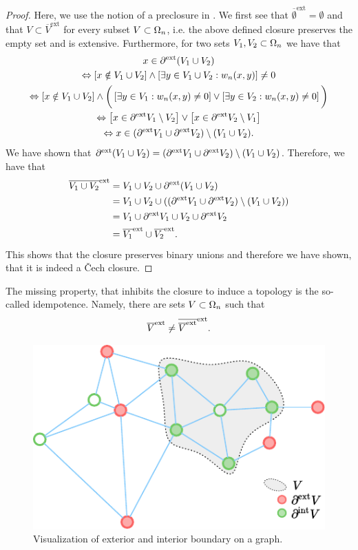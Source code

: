\begin{proof}
Here, we use the notion of a preclosure in \cite{vcech1966topological}.
We first see that $\overline{\emptyset}^{\text{ext}}=\emptyset$ and that $V\subset \overline{V}^{\text{ext}}$ for every subset $V\subset\Omega_n$, i.e. the above defined closure preserves the empty set and is extensive. Furthermore, for two sets $V_1,V_2\subset \Omega_n$ we have that
%
\begin{gather*} 
x\in \partial^{\text{ext}} (V_1\cup V_2)\\
\Leftrightarrow\left[x\notin V_1\cup V_2\right]\wedge \left[\exists y\in V_1\cup V_2: w_n(x,y) \right]\neq 0\\
\Leftrightarrow 
\left[x\notin V_1\cup V_2\right]\wedge
\bigg(\left[\exists y\in V_1: w_n(x,y) \neq 0 \right]\vee
\left[\exists y\in V_2: w_n(x,y) \neq 0 \right]\bigg)\\
\Leftrightarrow \left[x\in \partial^{\text{ext}} V_1\setminus V_2\right]\vee
\left[x\in  \partial^{\text{ext}} V_2 \setminus V_1 \right]\\
\Leftrightarrow x\in (\partial^{\text{ext}} V_1 \cup \partial^{\text{ext}} V_2)\setminus (V_1\cup V_2).
\end{gather*}
%
We have shown that $\partial^{\text{ext}} (V_1\cup V_2)=(\partial^{\text{ext}} V_1 \cup \partial^{\text{ext}} V_2)\setminus (V_1\cup V_2)$. Therefore, we have that
%
\begin{align*}
\overline{V_1\cup V_2}^{\text{ext}} &= 
V_1\cup V_2 \cup \partial^{\text{ext}} (V_1\cup V_2)\\
&= V_1\cup V_2 \cup ((\partial^{\text{ext}} V_1 \cup \partial^{\text{ext}} V_2)\setminus (V_1\cup V_2))\\
&= V_1\cup \partial^{\text{ext}} V_1 \cup V_2 \cup \partial^{\text{ext}} V_2\\
&= \overline{V_1}^{\text{ext}}\cup\overline{V_2}^{\text{ext}}.
\end{align*}
%
This shows that the closure preserves binary unions and therefore we have shown, that it is indeed a Čech closure.
\end{proof}
%
%
%
\noindent%
The missing property, that inhibits the closure to induce a topology is the so-called idempotence. Namely, there are sets $V\subset \Omega_n$ such that
%
\begin{align*}
\overline{V}^{\text{ext}} \neq \overline{\overline{V}^{\text{ext}}}^{\text{ext}}.
\end{align*}
%
\begin{figure}
\centering
\includegraphics{atelier/SSL/boundary.pdf}
\caption{Visualization of exterior and interior boundary on a graph.}\label{fig:graphb}
\end{figure}
